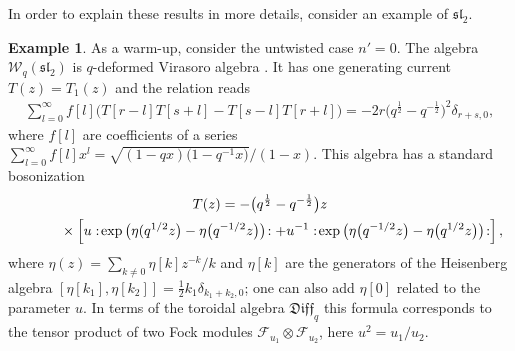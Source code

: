 \documentclass[pdftex]{sigma}
\numberwithin{equation}{section}
\theoremstyle{definition}
\newtheorem{Example}[Theorem]{Example}
\newcommand{\half}{\frac{1}{2}}
\newcommand{\qD}{\mathfrak{Diff}_q}
\begin{document}
In order to explain these results in more details, consider an example of $\mathfrak{sl}_2$.
\begin{Example} \label{examp: Int Fock odinary}
As a warm-up, consider the untwisted case $n'=0$. The algebra $\mathcal{W}_q(\mathfrak{sl}_2)$ is $q$-deformed Virasoro algebra \cite{SKAO}. It has one generating current $T(z)=T_1(z)$ and the relation reads
\begin{gather}\label{eq:Int TT}
\sum_{l=0}^{\infty} f[l] \big( T[r{-}l] T[s{+}l] - T[s{-}l] T[r{+}l] \big) = -2r\big(q^{\half}{-}q^{-\half}\big)^2 \delta_{r+s,0} ,
\end{gather}
where $f[l]$ are coefficients of a series $\sum\limits_{l=0}^{\infty} f[l] x^l=\sqrt{(1-qx)\big(1-q^{-1}x\big)}/(1-x)$. This algebra has a standard bosonization \cite{SKAO}
\begin{gather}
T (z) = - \big(q^{\half}-q^{-\half}\big) z \nonumber\\
\hphantom{T (z) =}{}\times \left[
u : \! \exp \big( \eta(q^{1/2} z\big) - \eta\big(q^{-1/2} z\big)\big) \! : +u^{-1} : \! \exp \big( \eta\big(q^{-1/2} z\big) - \eta\big(q^{1/2} z\big) \big) \! : \right],\label{eq:Int T st}
\end{gather}
where $\eta(z) = \sum\limits_{k \neq 0} \eta[k] z^{-k}/k$ and $\eta[k]$ are the generators of the Heisenberg algebra $[\eta[k_1], \eta[k_2]] = \frac12 k_1 \delta_{k_1+k_2,0}$; one can also add $\eta[0]$ related to the parameter $u$. In terms of the toroidal algebra $\qD$ this formula corresponds to the tensor product of two Fock modules $\mathcal{F}_{u_1}\otimes \mathcal{F}_{u_2}$, here $u^2=u_1/u_2$.
\end{Example}
\end{document}
